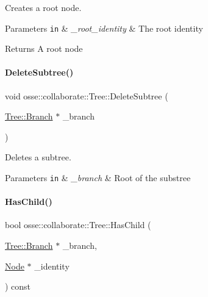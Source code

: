 Creates a root node. 


\begin{DoxyParams}[1]{Parameters}
\mbox{\tt in}  & {\em \+\_\+root\+\_\+identity} & The root identity \\
\hline
\end{DoxyParams}
\begin{DoxyReturn}{Returns}
A root node 
\end{DoxyReturn}
\mbox{\label{classosse_1_1collaborate_1_1_tree_a04a5fa19a165dd354966e59f48c0c681}} 
\paragraph{\texorpdfstring{Delete\+Subtree()}{DeleteSubtree()}}
{\footnotesize\ttfamily void osse\+::collaborate\+::\+Tree\+::\+Delete\+Subtree (\begin{DoxyParamCaption}\item[{\hyperlink{structosse_1_1collaborate_1_1_tree_1_1_branch}{Tree\+::\+Branch} $\ast$}]{\+\_\+branch }\end{DoxyParamCaption})}



Deletes a subtree. 


\begin{DoxyParams}[1]{Parameters}
\mbox{\tt in}  & {\em \+\_\+branch} & Root of the substree \\
\hline
\end{DoxyParams}
\mbox{\label{classosse_1_1collaborate_1_1_tree_a1147a0288752f6af47f3b058b4e4d134}} 
\paragraph{\texorpdfstring{Has\+Child()}{HasChild()}}
{\footnotesize\ttfamily bool osse\+::collaborate\+::\+Tree\+::\+Has\+Child (\begin{DoxyParamCaption}\item[{\hyperlink{structosse_1_1collaborate_1_1_tree_1_1_branch}{Tree\+::\+Branch} $\ast$}]{\+\_\+branch,  }\item[{\hyperlink{classosse_1_1collaborate_1_1_node}{Node} $\ast$}]{\+\_\+identity }\end{DoxyParamCaption}) const}



